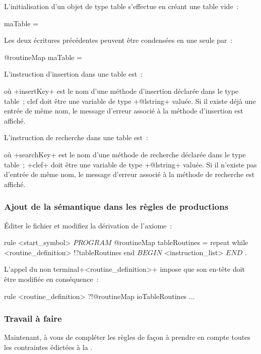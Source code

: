 L'initialisation d'un objet de type table s'effectue en créant une table vide~:
\begin{galgas}
maTable = {}
\end{galgas}

Les deux écritures précédentes peuvent être condensées en une seule par~:
\begin{galgas}
@routineMap maTable = {}
\end{galgas}

L'instruction d'insertion dans une table est~:
\begin{galgas}
\end{galgas}
où \ggs+insertKey+ est le nom d'une méthode d'insertion déclarée dans le type table~; clef doit être une variable de type \ggs+@lstring+ valuée. Si il existe déjà une entrée de même nom, le message d'erreur associé à la méthode d'insertion est affiché.

L'instruction de recherche dans une table est~:
\begin{galgas}
\end{galgas}
où \ggs+searchKey+ est le nom d'une méthode de recherche déclarée dans le type table~; \ggs+clef+ doit être une variable de type \ggs+@lstring+ valuée. Si il n'existe pas d'entrée de même nom, le message d'erreur associé à la méthode de recherche est affiché.

\subsubsection{Ajout de la sémantique dans les règles de productions}
Éditer le fichier  et modifiez la dérivation de l'axiome~:

\begin{galgas}
rule <start_symbol> {
  $PROGRAM$
  @routineMap tableRoutines = {}
  repeat
  while 
    <routine_definition> !?tableRoutines
  end
  $BEGIN$
  <instruction_list>
  $END$
  $.$
}
\end{galgas}

L'appel du non terminal\ggs+<routine_definition>+ impose que son en-tête doit être modifiée en conséquence~:
\begin{galgas}
rule <routine_definition> ?!@routineMap ioTableRoutines {
  ...
}
\end{galgas}

\subsubsection{Travail à faire}
Maintenant, à vous de compléter les règles de façon à prendre en compte toutes les contraintes édictées à la .

